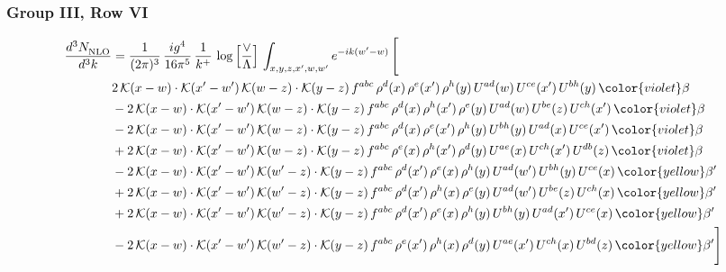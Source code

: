 \subsubsection{Group III, Row VI}
\begin{align}
     \frac{d^{3}N_{\rm NLO}^{\rm}}{d^{3}k}  & = \frac{1}{(2\pi)^{3}}\, \frac{ig^{4}}{16\pi^{5}}\, \frac{1}{k^{+}}\, \log{\left[\frac{\vee}{\Lambda}\right]}\, \int_{x,y,z,x^{\prime},w,w^{\prime}}e^{-ik(w^{\prime}-w)}\, \Bigg[\notag \\ & 2\,\mathcal{K}(x-w)\cdot \mathcal{K}(x'-w')\, \mathcal{K}(w-z)\cdot \mathcal{K}(y-z)\, f^{abc}\,\rho^{d}(x)\,\rho^{e}(x')\,\rho^{h}(y)\, U^{ad}(w)\,U^{ce}(x')\,U^{bh}(y)\,{\color{violet} \beta}\notag \\ & -2\,\mathcal{K}(x-w)\cdot \mathcal{K}(x'-w')\, \mathcal{K}(w-z)\cdot \mathcal{K}(y-z)\, f^{abc}\,\rho^{d}(x)\,\rho^{h}(x')\,\rho^{e}(y)\, U^{ad}(w)\,U^{be}(z)\,U^{ch}(x')\,{\color{violet} \beta}\notag \\ & - 2\,\mathcal{K}(x-w)\cdot \mathcal{K}(x'-w')\, \mathcal{K}(w-z)\cdot \mathcal{K}(y-z)\, f^{abc}\,\rho^{d}(x)\,\rho^{e}(x')\,\rho^{h}(y)\, U^{bh}(y)\,U^{ad}(x)\,U^{ce}(x')\,{\color{violet} \beta}\notag \\ & +2\,\mathcal{K}(x-w)\cdot \mathcal{K}(x'-w')\, \mathcal{K}(w-z)\cdot \mathcal{K}(y-z)\, f^{abc}\,\rho^{e}(x)\,\rho^{h}(x')\,\rho^{d}(y)\, U^{ae}(x)\,U^{ch}(x')\,U^{db}(z)\,{\color{violet} \beta}\notag \\ & -2\, \mathcal{K}(x-w) \cdot \mathcal{K}(x'-w')\, \mathcal{K}(w'-z) \cdot \mathcal{K}(y-z)\, f^{abc}\, \rho^{d}(x')\,\rho^{e}(x)\, \rho^{h}(y)\,U^{ad}(w')\,U^{bh}(y)\,U^{ce}(x)\, {\color{yellow} \beta'}\notag \\ & + 2\, \mathcal{K}(x-w) \cdot \mathcal{K}(x'-w')\, \mathcal{K}(w'-z) \cdot \mathcal{K}(y-z)\, f^{abc}\, \rho^{d}(x')\,\rho^{h}(x)\, \rho^{e}(y)\,U^{ad}(w')\,U^{be}(z)\,U^{ch}(x)\, {\color{yellow} \beta'}\notag \\ & +2\, \mathcal{K}(x-w) \cdot \mathcal{K}(x'-w')\, \mathcal{K}(w'-z) \cdot \mathcal{K}(y-z)\, f^{abc}\, \rho^{d}(x')\,\rho^{e}(x)\, \rho^{h}(y)\,U^{bh}(y)\,U^{ad}(x')\,U^{ce}(x)\, {\color{yellow} \beta'}\notag \\ & -2\, \mathcal{K}(x-w) \cdot \mathcal{K}(x'-w')\, \mathcal{K}(w'-z) \cdot \mathcal{K}(y-z)\, f^{abc}\, \rho^{e}(x')\,\rho^{h}(x)\, \rho^{d}(y)\,U^{ae}(x')\,U^{ch}(x)\,U^{bd}(z)\, {\color{yellow} \beta'}\Bigg]
     \end{align}
